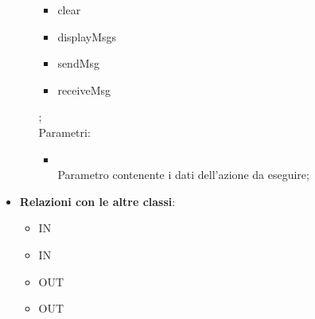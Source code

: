 \begin{itemize}
\begin{itemize}
\begin{itemize}
\item clear
\item displayMsgs
\item sendMsg
\item receiveMsg
\end{itemize};\\
		Parametri:
		\begin{itemize}
			\item {} \\
			Parametro contenente i dati dell'azione da eseguire;
		\end{itemize}
	\end{itemize}
	\item \textbf{Relazioni con le altre classi}:
	\begin{itemize}
		\item IN \hyperlink{ConversationApp_label}{}
		\item IN \hyperlink{ConversationView_label}{}
		\item OUT \hyperlink{ConversationAction_label}{}
		\item OUT \hyperlink{ConversationActionObserver_label}{}
	\end{itemize}
\end{itemize}
\FloatBarrier

